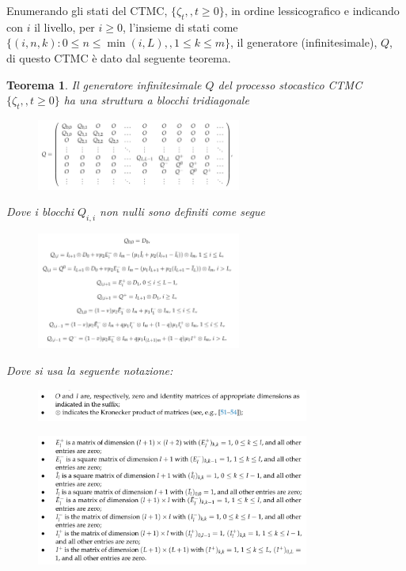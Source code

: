 \documentclass[11pt]{article}
\newtheorem{teorema}{Teorema}[section]
\begin{document}
Enumerando gli stati del CTMC, $\{\zeta_t,,t\geq 0\}$, in ordine lessicografico e indicando con $i$ il livello, per $i\geq 0$, l'insieme di stati come $\{(i,n,k):0\leq n\leq \min(i,L),,1\leq k\leq m\}$, il generatore (infinitesimale), $Q$, di questo CTMC è dato dal seguente teorema.

\clearpage
\begin{teorema}
    Il generatore infinitesimale $Q$ del processo stocastico CTMC $\{\zeta_t,,t\geq 0\}$ ha una struttura a blocchi tridiagonale

    \begin{figure}[h]
        \centering
        \includegraphics[width=0.6\textwidth]{E9pbGl1.png}
        \label{fig:generatore_infinitesimale}
    \end{figure}

    \noindent Dove i blocchi $Q_{i,i}$ non nulli sono definiti come segue

    \begin{figure}[h]
        \centering
        \includegraphics[width=0.6\textwidth]{T9RIVqa.png}
    \end{figure}

    \noindent Dove si usa la seguente notazione:

    \begin{figure}[h]
        \centering
        \includegraphics[width=0.8\textwidth]{avNOocE.png}
    \end{figure}

    \begin{figure}[h!]
        \centering
        \includegraphics[width=0.8\textwidth]{px6kcg9.png}
    \end{figure}


\end{teorema}
\end{document}
